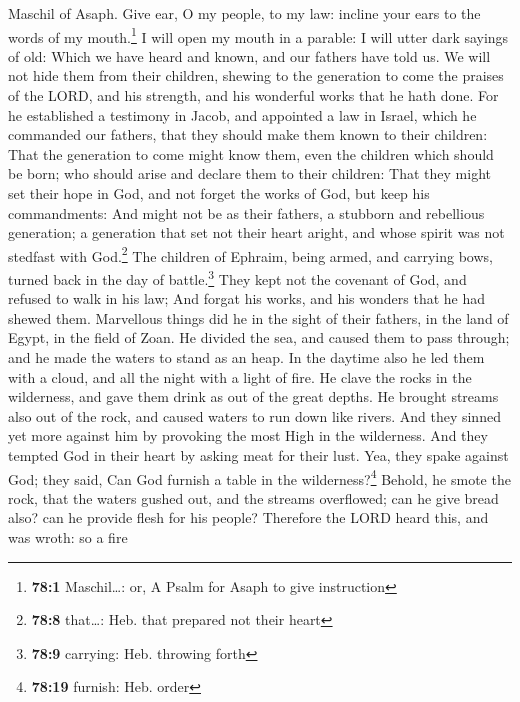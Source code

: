 Maschil of Asaph.  Give ear, O my people, to my law:
incline your ears to the words of my mouth.\footnote{\textbf{78:1}
  Maschil\ldots: or, A Psalm for Asaph to give instruction}
 I will open my mouth in a parable: I will utter dark
sayings of old:  Which we have heard and known, and our
fathers have told us.  We will not hide them from their
children, shewing to the generation to come the praises of the LORD, and
his strength, and his wonderful works that he hath done. 
For he established a testimony in Jacob, and appointed a law in Israel,
which he commanded our fathers, that they should make them known to
their children:  That the generation to come might know
them, even the children which should be born; who should arise and
declare them to their children:  That they might set their
hope in God, and not forget the works of God, but keep his commandments:
 And might not be as their fathers, a stubborn and
rebellious generation; a generation that set not their heart aright, and
whose spirit was not stedfast with God.\footnote{\textbf{78:8}
  that\ldots: Heb. that prepared not their heart}  The
children of Ephraim, being armed, and carrying bows, turned back in the
day of battle.\footnote{\textbf{78:9} carrying: Heb. throwing forth}
 They kept not the covenant of God, and refused to walk
in his law;  And forgat his works, and his wonders that
he had shewed them.  Marvellous things did he in the
sight of their fathers, in the land of Egypt, in the field of Zoan.
 He divided the sea, and caused them to pass through; and
he made the waters to stand as an heap.  In the daytime
also he led them with a cloud, and all the night with a light of fire.
 He clave the rocks in the wilderness, and gave them
drink as out of the great depths.  He brought streams
also out of the rock, and caused waters to run down like rivers.
 And they sinned yet more against him by provoking the
most High in the wilderness.  And they tempted God in
their heart by asking meat for their lust.  Yea, they
spake against God; they said, Can God furnish a table in the
wilderness?\footnote{\textbf{78:19} furnish: Heb. order} 
Behold, he smote the rock, that the waters gushed out, and the streams
overflowed; can he give bread also? can he provide flesh for his people?
 Therefore the LORD heard this, and was wroth: so a fire
